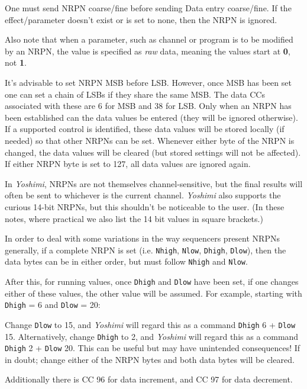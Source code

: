    One must send NRPN coarse/fine before sending Data entry coarse/fine.  If
   the effect/parameter doesn't exist or is set to none, then the NRPN is
   ignored.

   Also note that when a parameter, such as channel or program is to be modified
   by an NRPN, the value is specified as \textsl{raw} data, meaning the values
   start at \textbf{0}, not \textbf{1}.

   It's advisable to set NRPN MSB before LSB. However, once MSB has
   been set one can set a chain of LSBs if they share the same MSB.
   The data CCs associated with these are 6 for MSB and 38 for LSB.
   Only when an NRPN has been established can the data values be entered
   (they will be ignored otherwise).
   If a supported control is identified, these data values will be stored
   locally (if needed) so that other NRPNs can be set.
   Whenever either byte of the NRPN is changed, the data values will be
   cleared (but stored settings will not be affected).
   If either NRPN byte is set to 127, all data values are ignored again.

   In \textsl{Yoshimi}, NRPNs are not themselves channel-sensitive, but the
   final results will often be sent to whichever is the current channel.
   \textsl{Yoshimi} also supports the curious 14-bit NRPNs, but this shouldn't
   be noticeable to the user.
   (In these notes, where practical we also list the 14 bit values in square
   brackets.)

   In order to deal with some
   variations in the way sequencers present NRPNs generally, if a complete
   NRPN is set
   (i.e. \texttt{Nhigh}, \texttt{Nlow}, \texttt{Dhigh}, \texttt{Dlow}),
   then the data bytes can be in
   either order, but must follow \texttt{Nhigh} and \texttt{Nlow}.

   After this, for running values, once
   \texttt{Dhigh} and \texttt{Dlow} have been set, if one
   changes either of these values, the other value will be assumed.
   For example, starting with \texttt{Dhigh} = 6 and \texttt{Dlow} = 20:

   Change \texttt{Dlow} to 15, and \textsl{Yoshimi} will regard this as a
   command \texttt{Dhigh} 6 + \texttt{Dlow} 15.
   Alternatively, change
   \texttt{Dhigh} to 2, and \textsl{Yoshimi} will regard this as a
   command \texttt{Dhigh} 2 + \texttt{Dlow} 20.
   This can be useful but may have unintended consequences!
   If in doubt; change either of the NRPN bytes and both data bytes will be
   cleared.

   Additionally there is CC 96 for data increment, and CC 97 for data
   decrement.

